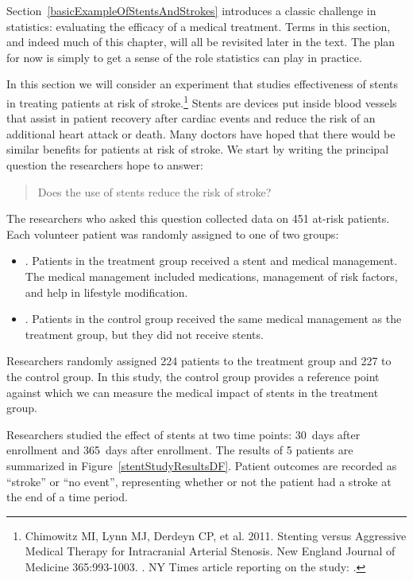 
Section~\ref{basicExampleOfStentsAndStrokes} introduces a classic challenge in statistics: evaluating the efficacy of a medical treatment. Terms in this section, and indeed much of this chapter, will all be revisited later in the text. The plan for now is simply to get a sense of the role statistics can play in practice.

In this section we will consider an experiment that studies effectiveness of stents in treating patients at risk of stroke.\footnote{Chimowitz MI, Lynn MJ, Derdeyn CP, et al. 2011. Stenting versus Aggressive Medical Therapy for Intracranial Arterial Stenosis. New England Journal of Medicine 365:993-1003. . NY Times article reporting on the study: .} Stents are devices put inside blood vessels that assist in patient recovery after cardiac events and reduce the risk of an additional heart attack or death. Many doctors have hoped that there would be similar benefits for patients at risk of stroke. We start by writing the principal question the researchers hope to answer:
\begin{quote}
Does the use of stents reduce the risk of stroke?
\end{quote}

The researchers who asked this question collected data on 451 at-risk patients. Each volunteer patient was randomly assigned to one of two groups:
\begin{itemize}
\item[]. Patients in the treatment group received a stent and medical management. The medical management included medications, management of risk factors, and help in lifestyle modification.
\item[]. Patients in the control group received the same medical management as the treatment group, but they did not receive stents.
\end{itemize}
Researchers randomly assigned 224 patients to the treatment group and 227 to the control group. In this study, the control group provides a reference point against which we can measure the medical impact of stents in the treatment group.

Researchers studied the effect of stents at two time points: 30~days after enrollment and 365~days after enrollment. The results of 5 patients are summarized in Figure~\ref{stentStudyResultsDF}. Patient outcomes are recorded as ``stroke'' or ``no event'', representing whether or not the patient had a stroke at the end of a time period.

